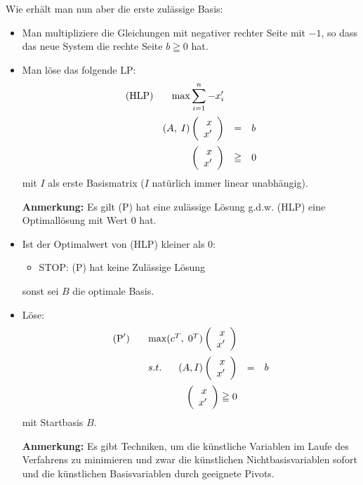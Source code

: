 Wie erhält man nun aber die erste zulässige Basis:
\begin{itemize}
\item  Man multipliziere die
Gleichungen mit negativer rechter Seite mit $-1$, so dass das neue System
die rechte Seite $b\geqq0$ hat.
\item  Man löse das folgende LP:
\[\begin{array}{rcl}
(\mbox{HLP}) \hspace{6mm} \max \displaystyle \sum^{n}_{i=1} -x_{i}'\vspace{2mm}\\
(A, \; I) \vect{x\\x'} &=&b\vspace{2mm}\\
\vect{x\\x'}&\geqq&0
\end{array}\]
mit $I$ als erste Basismatrix ($I$ natürlich immer linear unabhängig).

{\bf Anmerkung:} Es gilt (P) hat eine zulässige Lösung g.d.w. (HLP) eine
Optimallösung mit Wert 0 hat.

\item Ist der Optimalwert von (HLP) kleiner als 0:
\begin{itemize}
\item[\mbox{}] STOP: (P) hat keine Zulässige Lösung
\end{itemize}
sonst sei $B$ die optimale Basis.
\item Löse:
\[\begin{array}{rcl}
(\mbox{P}') \hspace{6mm} \max (c^{T}, \; 0^{T}) \vect{x\\x'}\vspace {2mm}\\
s.t. \hspace{6mm} (A, I) \vect{x\\x'} &=&b\vspace{2mm}\\
\vect{x\\x'} \geqq 0
\end{array}\]
mit Startbasis $B$.

{\bf Anmerkung:} Es gibt Techniken, um die künstliche Variablen im Laufe 
des Verfahrens zu minimieren und zwar die künstlichen Nichtbasisvariablen 
sofort und die künstlichen Basisvariablen durch geeignete Pivots.
\end{itemize}


